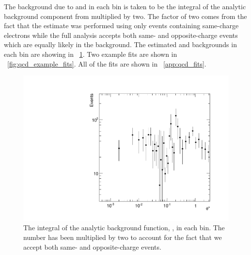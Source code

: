 The background due to \QCDjets and \wjets in each \phistar bin is taken to be
the integral of the analytic background component from \MassRange multiplied by
two. The factor of two comes from the fact that the estimate was performed
using only events containing same-charge electrons while the full analysis
accepts both same- and opposite-charge events which are equally likely in the
background. The estimated \QCDjets and \wjets backgrounds in each \phistar bin
are showing in \FIG~\ref{fig:qcd_phistar}. Two example fits are shown in
\FIG~\ref{fig:qcd_example_fits}. All of the fits are shown in
\APP~\ref{app:qcd_fits}.

\begin{figure}[!htbp]
    \centering
    \includegraphics[width=\textwidth]{figures/qcd_phistar.pdf}
    \caption[
        The integral of the analytic background function in each \phistar bin.
    ]{
        The integral of the analytic background function, \BGFunc, in each
        \phistar bin. The number has been multiplied by two to account for the
        fact that we accept both same- and opposite-charge events.
    }
    \label{fig:qcd_phistar}
\end{figure}

